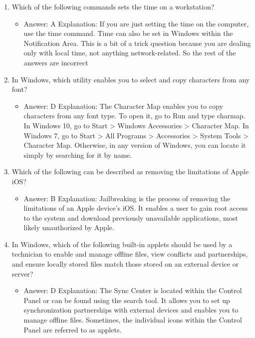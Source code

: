 \documentclass{article}
\begin{document}
\begin{enumerate}
\begin{itemize}
    \end{itemize}
    \item Which of the following commands sets the time on a workstation?
    \begin{itemize}
        \item Answer: A
Explanation: If you are just setting the time on the computer, use the time command.
Time can also be set in Windows within the Notification Area. This is a bit of a trick
question because you are dealing only with local time, not anything network-related.
So the rest of the answers are incorrect
    \end{itemize}
    \item In Windows, which utility enables you to select and copy characters
from any font?
    \begin{itemize}
        \item Answer: D
Explanation: The Character Map enables you to copy characters from any font type.
To open it, go to Run and type charmap. In Windows 10, go to Start > Windows
Accessories > Character Map. In Windows 7, go to Start > All Programs > Accessories >
System Tools > Character Map. Otherwise, in any version of Windows, you can locate
it simply by searching for it by name.
    \end{itemize}
    \item Which of the following can be described as removing the limitations
of Apple iOS?
    \begin{itemize}
        \item Answer: B
Explanation: Jailbreaking is the process of removing the limitations of an Apple
device’s iOS. It enables a user to gain root access to the system and download previously
unavailable applications, most likely unauthorized by Apple.
    \end{itemize}
    \item In Windows, which of the following built-in applets should be used
by a technician to enable and manage offline files, view conflicts
and partnerships, and ensure locally stored files match those
stored on an external device or server?
    \begin{itemize}
        \item Answer: D
Explanation: The Sync Center is located within the Control Panel or can be found using
the search tool. It allows you to set up synchronization partnerships with external
devices and enables you to manage offline files. Sometimes, the individual icons within
the Control Panel are referred to as applets.
    \end{itemize}

\end{enumerate}
\end{document}
